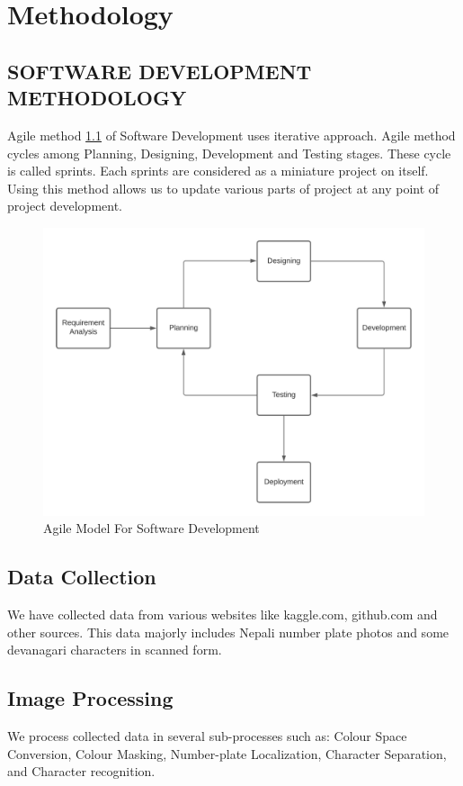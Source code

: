\chapter{Methodology}
\section{SOFTWARE DEVELOPMENT METHODOLOGY}
Agile method \ref{fig:agile_model_for_sdlc} of Software Development uses iterative approach. Agile method cycles among Planning, Designing, Development and Testing stages. These cycle is called sprints. Each sprints are considered as a miniature project on itself. Using this method allows us to update various parts of project at any point of project development.
\begin{figure}[H]
    \centering
    \includegraphics[scale=0.7]{img/AgileMethodology.png}
    \caption{Agile Model For Software Development}
    \label{fig:agile_model_for_sdlc}
\end{figure}
\newpage
\section{Data Collection}
We have collected data from various websites like kaggle.com, github.com and other sources. This data majorly includes Nepali number plate photos and some devanagari
characters in scanned form.

\section{Image Processing}
We process collected data in several sub-processes such as: Colour Space Conversion, Colour Masking, Number-plate Localization, Character Separation, and Character recognition.
